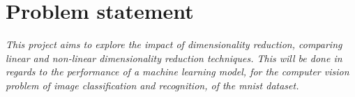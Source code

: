 \section{Problem statement}\label{sec:problem-statement}
\emph{This project aims to explore the impact of dimensionality reduction, comparing linear and non-linear dimensionality reduction techniques. This will be done in regards to the performance of a machine learning model, for the computer vision problem of image classification and recognition, of the mnist dataset.}







